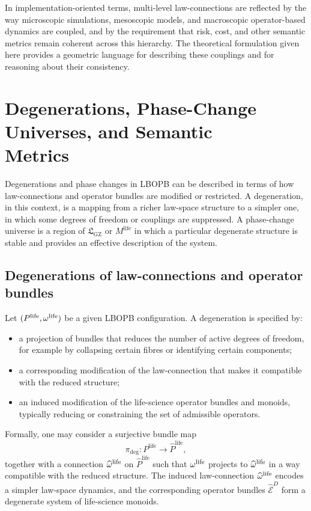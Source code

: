 \documentclass[11pt]{book}
\theoremstyle{plain}
\theoremstyle{definition}
\theoremstyle{remark}
\newcommand{\GZLS}{\ensuremath{\mathfrak{L}_{\mathrm{GZ}}}}       \newcommand{\GZLT}{\ensuremath{M_{!w}}}                           \newcommand{\GZLOC}{\ensuremath{A_M}}                             \newcommand{\GZLCurv}{\ensuremath{\mathcal{F}_{\mathrm{law}}}}
\begin{document}
In implementation-oriented terms, multi-level law-connections are
reflected by the way microscopic simulations, mesoscopic models, and
macroscopic operator-based dynamics are coupled, and by the
requirement that risk, cost, and other semantic metrics remain
coherent across this hierarchy. The theoretical formulation given here
provides a geometric language for describing these couplings and for
reasoning about their consistency.

\section[Degenerations, Phase-Change Universes, and Semantic Metrics]{Degenerations, Phase-Change Universes, and Semantic \\Metrics}


Degenerations and phase changes in LBOPB can be described in terms of
how law-connections and operator bundles are modified or restricted.
A degeneration, in this context, is a mapping from a richer law-space
structure to a simpler one, in which some degrees of freedom or
couplings are suppressed. A phase-change universe is a region of
$\GZLS$ or $M^{\mathrm{life}}$ in which a particular degenerate
structure is stable and provides an effective description of the
system.

\subsection*{Degenerations of law-connections and operator bundles}

Let $(P^{\mathrm{life}}, \omega^{\mathrm{life}})$ be a given LBOPB
configuration. A degeneration is specified by:

\begin{itemize}
  \item a projection of bundles that reduces the number of active
        degrees of freedom, for example by collapsing certain fibres or
        identifying certain components;
  \item a corresponding modification of the law-connection that makes
        it compatible with the reduced structure;
  \item an induced modification of the life-science operator bundles
        and monoids, typically reducing or constraining the set of
        admissible operators.
\end{itemize}

Formally, one may consider a surjective bundle map
\[
  \pi_{\mathrm{deg}} \colon P^{\mathrm{life}}
  \longrightarrow \widehat{P}^{\mathrm{life}},
\]
together with a connection $\widehat{\omega}^{\mathrm{life}}$ on
$\widehat{P}^{\mathrm{life}}$ such that $\omega^{\mathrm{life}}$ projects
to $\widehat{\omega}^{\mathrm{life}}$ in a way compatible with the
reduced structure. The induced law-connection
$\widehat{\omega}^{\mathrm{life}}$ encodes a simpler law-space
dynamics, and the corresponding operator bundles
$\widehat{\mathcal{E}}^{D}$ form a degenerate system of life-science
monoids.
\end{document}
